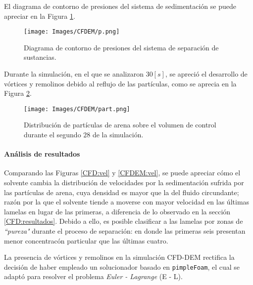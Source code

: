 \newpage

\noindent
\justify

El diagrama de contorno de presiones del sistema de sedimentaci\'on se puede apreciar en la Figura \ref{CFDEM:p}.

\begin{figure}[h!]
	\centering
	\texttt{[image: Images/CFDEM/p.png]}
	\caption{Diagrama de contorno de presiones del sistema de separaci\'on de sustancias.}
	\label{CFDEM:p}
\end{figure}

\noindent
\justify

Durante la simulaci\'on, en el que se analizaron $30 [s]$, se apreci\'o el desarrollo de v\'ortices y remolinos debido al reflujo de las part\'iculas, como se aprecia en la Figura \ref{CFDEM:part}.

\begin{figure}[h!]
	\centering
	\texttt{[image: Images/CFDEM/part.png]}
	\caption{Distribuci\'on de part\'iculas de arena sobre el volumen de control durante el segundo $28$ de la simulaci\'on.}
	\label{CFDEM:part}
\end{figure}

\newpage

\paragraph{An\'alisis de resultados} \label{CFDEM:analisis}

\noindent
\justify

Comparando las Figuras \ref{CFD:vel} y \ref{CFDEM:vel}, se puede apreciar c\'omo el solvente cambia la distribuci\'on de velocidades por la sedimentaci\'on sufrida por las part\'iculas de arena, cuya densidad es mayor que la del fluido circundante; raz\'on por la que el solvente tiende a moverse con mayor velocidad en las \'ultimas lamelas en lugar de las primeras, a diferencia de lo observado en la secci\'on \ref{CFD:resultados}. Debido a ello, es posible clasificar a las lamelas por zonas de \textit{``pureza"} durante el proceso de separaci\'on: en donde las primeras seis presentan menor concentrac\'on particular que las \'ultimas cuatro.

\noindent
\justify

La presencia de v\'ortices y remolinos en la simulaci\'on CFD-DEM rectifica la decisi\'on de haber empleado un solucionador basado en \texttt{pimpleFoam}, el cual se adapt\'o para resolver el problema \textit{Euler - Lagrange} (E - L).

